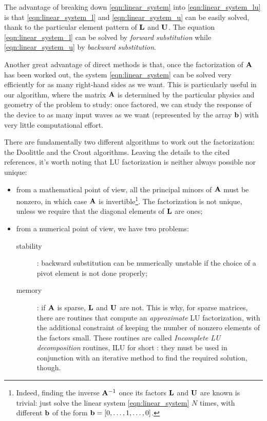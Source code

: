 The advantage of breaking down \eqref{eqn:linear_system} into
\eqref{eqn:linear_system_lu} is that \eqref{eqn:linear_system_l} and
\eqref{eqn:linear_system_u} can be easily solved, thank to the
particular element pattern of $\mathbf{L}$ and $\mathbf{U}$. The
equation \eqref{eqn:linear_system_l} can be solved by \emph{forward
  substitution} while \eqref{eqn:linear_system_u} by \emph{backward
  substitution}.

Another great advantage of direct methods is that, once the
factorization of $\mathbf{A}$ has been worked out, the system
\eqref{eqn:linear_system} can be solved very efficiently for as many
right-hand sides as we want. This is particularly useful in our
algorithm, where the matrix $\mathbf{A}$ is determined by the
particular physics and geometry of the problem to study: once
factored, we can study the response of the device to as many input
waves as we want (represented by the array $\mathbf{b}$) with very
little computational effort.

There are fundamentally two different algorithms to work out the
factorization: the Doolittle \cite{wikipedia} and the Crout
\cite{numerical_recipies} algorithms. Leaving the details to the cited
references, it's worth noting that LU factorization is neither always
possible nor unique:
\begin{itemize}
\item
  from a mathematical point of view, all the principal minors of
  $\mathbf{A}$ must be nonzero, in which case $\mathbf{A}$ is
  invertible\footnote{Indeed, finding the inverse $\mathbf{A}^{-1}$
  once its factors $\mathbf{L}$ and $\mathbf{U}$ are known is trivial:
  just solve the linear system \eqref{eqn:linear_system} $N$ times,
  with different $\mathbf{b}$ of the form $\mathbf{b} =
  \left[0,\dotsc,1,\dotsc,0\right]$.}. The factorization
  is not unique, unless we require that the diagonal elements of
  $\mathbf{L}$ are ones;
\item
  from a numerical point of view, we have two problems:
  \begin{description}
    \item[stability]: backward substitution can be numerically unstable if the choice
      of a pivot element is not done properly;
    \item[memory]: if $\mathbf{A}$ is sparse, $\mathbf{L}$ and $\mathbf{U}$ are
      not. This is why, for sparse matrices, there are routines that
      compute an \emph{approximate} LU factorization, with the
      additional constraint of keeping the number of nonzero elements
      of the factors small. These routines are called \emph{Incomplete
      LU decomposition} routines, ILU for short \cite{nag}: they
      must be used in conjunction with an iterative method to find the
      required solution, though.
  \end{description}
\end{itemize}

